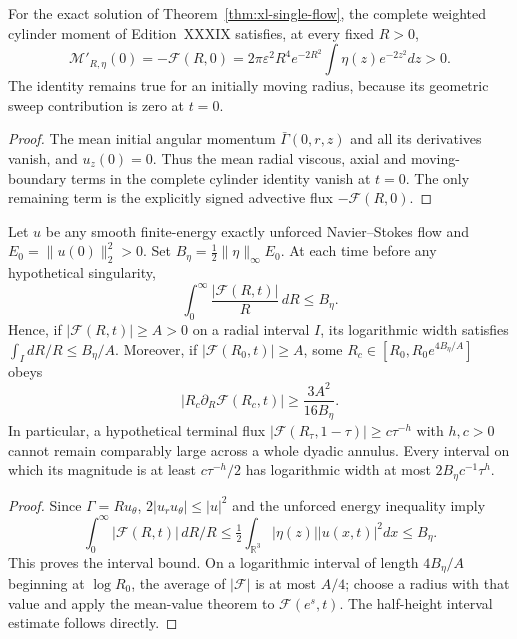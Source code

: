 \begin{proposition}
\label{prop:xl-moment-production}
For the exact solution of Theorem~\ref{thm:xl-single-flow},
the complete weighted cylinder moment of Edition~XXXIX
satisfies, at every fixed $R>0$,
\begin{equation}\label{eq:xl-moment-production}
\boxed{\quad
\mathcal M'_{R,\eta}(0)
=-\mathcal F(R,0)
=2\pi\varepsilon^2R^4e^{-2R^2}
\int\eta(z)e^{-2z^2}dz>0.\quad}
\end{equation}
The identity remains true for an initially moving radius,
because its geometric sweep contribution is zero at $t=0$.
\end{proposition}
\begin{proof}
The mean initial angular momentum $\bar\Gamma(0,r,z)$
and all its derivatives vanish, and $u_z(0)=0$.
Thus the mean radial viscous, axial and moving-boundary
terms in the complete cylinder identity vanish at $t=0$.
The only remaining term is the explicitly signed
advective flux $-\mathcal F(R,0)$.
\end{proof}

\begin{theorem}
\label{thm:xl-concentration}
Let $u$ be any smooth finite-energy exactly unforced
Navier--Stokes flow and $E_0=\|u(0)\|_2^2>0$.
Set $B_\eta=\frac12\|\eta\|_\infty E_0$.
At each time before any hypothetical singularity,
\begin{equation}\label{eq:xl-logbudget}
\boxed{\quad
\int_0^\infty\frac{|\mathcal F(R,t)|}{R}\,dR
\le B_\eta.\quad}
\end{equation}
Hence, if $|\mathcal F(R,t)|\ge A>0$ on a
radial interval $I$, its logarithmic width satisfies
$\int_I dR/R\le B_\eta/A$.
Moreover, if $|\mathcal F(R_0,t)|\ge A$,
some $R_c\in[R_0,R_0e^{4B_\eta/A}]$ obeys
\begin{equation}\label{eq:xl-steep}
\boxed{\quad
|R_c\partial_R\mathcal F(R_c,t)|
\ge \frac{3A^2}{16B_\eta}.\quad}
\end{equation}
In particular, a hypothetical terminal flux
$|\mathcal F(R_\tau,1-\tau)|\ge c\tau^{-h}$
with $h,c>0$ cannot remain comparably large
across a whole dyadic annulus.
Every interval on which its magnitude is at least
$c\tau^{-h}/2$ has logarithmic width at most
$2B_\eta c^{-1}\tau^h$.
\end{theorem}
\begin{proof}
Since $\Gamma=Ru_\theta$,
$2|u_ru_\theta|\le |u|^2$ and the unforced
energy inequality imply
\[
\int_0^\infty|\mathcal F(R,t)|\,dR/R
\le\tfrac12\int_{\mathbb R^3}|\eta(z)||u(x,t)|^2dx
\le B_\eta.
\]
This proves the interval bound.
On a logarithmic interval of length $4B_\eta/A$
beginning at $\log R_0$, the average of
$|\mathcal F|$ is at most $A/4$; choose a radius
with that value and apply the mean-value theorem
to $\mathcal F(e^s,t)$.
The half-height interval estimate follows directly.
\end{proof}

